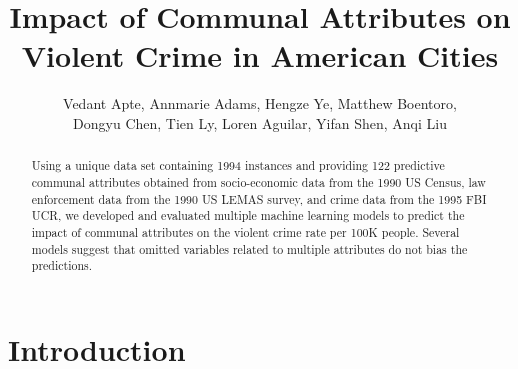 \documentclass[letterpaper, 11 pt, conference]{article}
\title{Impact of Communal Attributes on Violent Crime in American Cities}
\author{Vedant Apte, Annmarie Adams, Hengze Ye, Matthew Boentoro, \\Dongyu Chen, Tien Ly, Loren Aguilar,  Yifan Shen, Anqi Liu}
\begin{document}
\maketitle

\begin{abstract}
Using a unique data set containing 1994 instances and providing 122 predictive communal attributes obtained from socio-economic data from the 1990 US Census, law enforcement data from the 1990 US LEMAS survey, and crime data from the 1995 FBI UCR, we developed and evaluated multiple machine learning models to predict the impact of communal attributes on the violent crime rate per 100K people. Several models suggest that omitted variables related to multiple attributes do not bias the predictions.
\end{abstract}

\section{Introduction}
\end{document}
